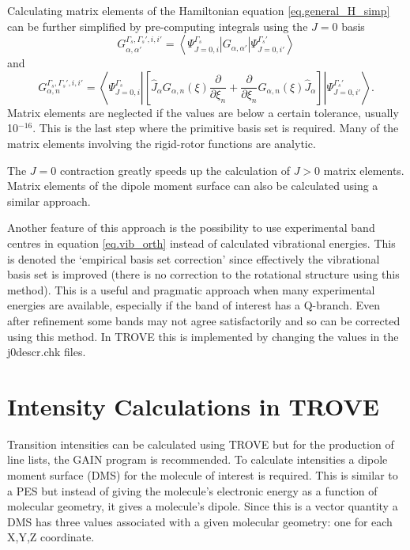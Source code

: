 Calculating matrix elements of the Hamiltonian equation \ref{eq.general_H_simp} can be further simplified by pre-computing
integrals using the $J=0$ basis
\begin{equation}
G_{\alpha,\alpha'}^{\Gamma_s,\Gamma_s',i,i'} = \left< \Psi_{J=0,i}^{\Gamma_s} | G_{\alpha,\alpha'} | \Psi_{J=0,i'}^{\Gamma_s'}
\right>
\end{equation}
and
\begin{equation}
G_{\alpha,n}^{\Gamma_s,\Gamma_s',i,i'} = \left< \Psi_{J=0,i}^{\Gamma_s} | \left[\hat{J}_{\alpha} G_{\alpha,n}(\xi) 
          \frac{\partial}{\partial \xi_n} + \frac{\partial}{\partial \xi_n} G_{\alpha,n}(\xi) \hat{J}_{\alpha} \right]
          | \Psi_{J=0,i'}^{\Gamma_s'} \right>.
\end{equation}
Matrix elements are neglected if the values are below a certain tolerance, usually 10$^{-16}$. This is the last step where
the primitive basis set is required. Many of the matrix elements involving the rigid-rotor functions are analytic. 

The $J=0$ contraction greatly speeds up the calculation of $J>0$ matrix elements. Matrix elements of the dipole moment surface
can also be calculated using a similar approach.

Another feature of this approach is the possibility to use experimental band centres in equation \ref{eq.vib_orth} instead
of calculated vibrational energies. This is denoted the `empirical basis set correction' since effectively the vibrational
basis set is improved (there is no correction to the rotational structure using this method). This is a useful and pragmatic
approach when many experimental energies are available, especially if the band of interest has a Q-branch. Even after
refinement some bands may not agree satisfactorily and so can be corrected using this method. In TROVE this is implemented
by changing the values in the j0descr.chk files.




\section{Intensity Calculations in TROVE}

Transition intensities can be calculated using TROVE but for the production of line lists, the GAIN program is recommended.
To calculate intensities a dipole moment surface (DMS) for the molecule of interest is required. This is similar to a PES
but instead of giving the molecule's electronic energy as a function of molecular geometry, it gives a molecule's dipole. 
Since this is a vector quantity a DMS has three values associated with a given molecular geometry: one for each X,Y,Z
coordinate. 

